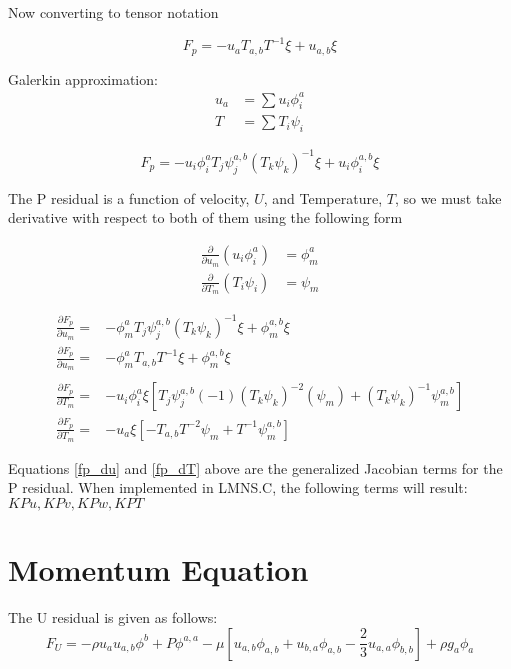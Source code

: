 \documentclass[10pt]{article}
\begin{document}
Now converting to tensor notation

\begin{equation}
    F_p = -u_a T_{a,b} T^{-1} \xi + u_{a,b}\xi
\end{equation}

Galerkin approximation:
\begin{align*}
    u_a &= \sum u_i \phi_i^a\\
    T &= \sum T_i \psi_i
\end{align*}

\begin{equation}
    F_p = -u_i \phi_i^a T_j \psi_j^{a,b} (T_k \psi_k)^{-1} \xi + u_i \phi_i^{a,b} \xi
\end{equation}

The P residual is a function of velocity, $U$, and Temperature, $T$, so we must take derivative with respect to both of them using the following form

\begin{align*}
    \frac{\partial}{\partial u_m} (u_i \phi_i^a) &= \phi_m^a \\
    \frac{\partial}{\partial T_m} (T_i \psi_i) &= \psi_m
\end{align*}

\begin{align}
    \frac{\partial F_p}{\partial u_m} = &-\phi_m^{a} T_j \psi_j^{a,b} (T_k \psi_k)^{-1} \xi + \phi_m^{a,b} \xi \nonumber \\
    \frac{\partial F_p}{\partial u_m} = &-\phi_m^{a} T_{a,b} T^{-1} \xi + \phi_m^{a,b} \xi \label {fp_du}\\ 
    \nonumber \\
    \frac{\partial F_p}{\partial T_m} = &-u_i \phi_i^a \xi \left [ T_j \psi_j^{a,b} (-1) (T_k \psi_k)^{-2} (\psi_m) + (T_k \psi_k)^{-1} \psi_m^{a,b} \right ] \nonumber \\
    \frac{\partial F_p}{\partial T_m} = &-u_a \xi \left [ -T_{a,b} T^{-2} \psi_m + T^{-1} \psi_m^{a,b} \right ] \label{fp_dT}
\end{align}

Equations \ref{fp_du} and \ref{fp_dT} above are the generalized Jacobian terms for the P residual. When implemented in LMNS.C, the following terms will result:\\
$KPu, KPv, KPw, KPT$


\section{Momentum Equation}
The U residual is given as follows:
\begin{equation}
    F_U = -\rho u_a u_{a,b} \phi^b + P \phi^{a,a} - \mu \left [u_{a,b} \phi_{a,b} + u_{b,a} \phi_{a,b} - \frac{2}{3} u_{a,a} \phi_{b,b} \right ] + \rho g_a \phi_a
\end{equation}
\end{document}
